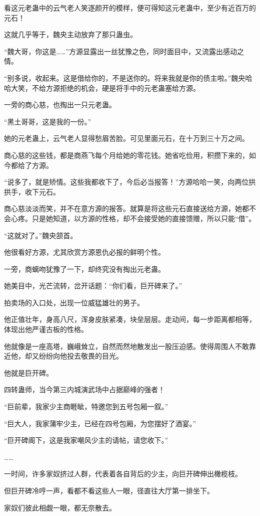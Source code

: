 \begin{this_body}
看这元老蛊中的云气老人笑逐颜开的模样，便可得知这元老蛊中，至少有近百万的元石！

这就几乎等于，魏央主动放弃了那只蛊虫。

“魏大哥，你这是……”方源显露出一丝犹豫之色，同时面目中，又流露出感动之情。

“别多说，收起来。这是借给你的，不是送你的。将来我就是你的债主啦。”魏央哈哈大笑，不给方源拒绝的机会，硬是将手中的元老蛊塞给方源。

一旁的商心慈，也掏出一只元老蛊。

“黑土哥哥，这是我的一份。”

她的元老蛊上，云气老人显得愁眉苦脸。可见里面元石，在十万到三十万之间。

商心慈的这些钱，都是商燕飞每个月给她的零花钱。她省吃俭用，积攒下来的，如今都给了方源。

“说多了，就是矫情。这些我都收下了，今后必当报答！”方源哈哈一笑，向两位拱拱手，收下元石。

商心慈淡淡而笑，并不在意方源的报答。就算是将这些元石直接送给方源，她都不会心疼。只是她知道，以方源的性格，却不会接受她的直接馈赠，所以只能“借”。

“这就对了。”魏央颔首。

他很看好方源，尤其欣赏方源恩仇必报的鲜明个性。

一旁，商螭吻犹豫了一下，却终究没有掏出元老蛊。

她美目中，光芒流转，岔开话题：“你们看，巨开碑来了。”

拍卖场的入口处，出现一位威猛雄壮的男子。

他正值壮年，身高八尺，浑身皮肤紧凑，块垒层层。走动间，每一步距离都相等，体现出他严谨古板的性格。

他就像是一座高塔，巍峨耸立，自然而然地散发出一股压迫感。使得周围人不敢靠近他，却又纷纷向他投去敬畏的目光。

他就是巨开碑。

四转蛊师，当今第三内城演武场中占据巅峰的强者！

“巨前辈，我家少主商睚眦，特邀您到五号包厢一叙。”

“巨大人，我家蒲牢少主，已经在四号包厢，为您摆好了酒宴。”

“巨开碑阁下，这是我家嘲风少主的请帖，请您收下。”

……

一时间，许多家奴挤过人群，代表着各自背后的少主，向巨开碑伸出橄榄枝。

但巨开碑冷哼一声，看都不看这些人一眼，径直往大厅第一排坐下。

家奴们彼此相觑一眼，都无奈散去。


\end{this_body}
